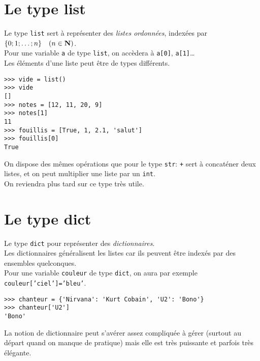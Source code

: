 \section{Le type list}

Le type \texttt{list} sert à représenter des \textit{listes ordonnées}, indexées par $\lbrace 0;1;\ldots ;n\rbrace\quad (n\in\mathbf{N})$.\\
Pour une variable \texttt{a} de type \texttt{list}, on accèdera à \texttt{a[0]}, \texttt{a[1]}\ldots\\
Les éléments d'une liste peut être de types différents.

\begin{pys}\begin{verbatim}
>>> vide = list()
>>> vide
[]
>>> notes = [12, 11, 20, 9]
>>> notes[1]
11
>>> fouillis = [True, 1, 2.1, 'salut']
>>> fouillis[0]
True
\end{verbatim}
\end{pys}

On dispose des mêmes opérations que pour le type \texttt{str}: \texttt{+} sert à concaténer deux listes, et on peut multiplier une liste par un \texttt{int}.\\

On reviendra plus tard sur ce type très utile.

\section{Le type dict}
Le type \texttt{dict} pour représenter des \textit{dictionnaires}.\\
Les dictionnaires généralisent les listes car ils peuvent être indexés par des ensembles quelconques.\\
Pour une variable \texttt{couleur} de type \texttt{dict}, on aura par exemple \texttt{couleur['ciel']='bleu'}.

\begin{pys}\begin{verbatim}
>>> chanteur = {'Nirvana': 'Kurt Cobain', 'U2': 'Bono'}
>>> chanteur['U2']
'Bono'
\end{verbatim}
\end{pys}


La notion de dictionnaire peut s'avérer assez compliquée à gérer (surtout au départ quand on manque de pratique) mais elle est très puissante et parfois très élégante.\\

